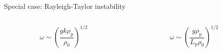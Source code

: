 \documentclass[final]{beamer} %
\begin{document}
\begin{frame}[t]
\begin{block}{Special case: Rayleigh-Taylor instability}
\begin{columns}[t]
\begin{column}{0.3\paperwidth}
        \vspace{1cm}

        \begin{columns}[c]
          
          \begin{column}{0.15\paperwidth}

            \centering $$\omega \sim \left(\frac{g k \rho_{\text{p}}}{\rho_{0}}\right)^{1/2}$$
        
          \end{column}

          \begin{column}{0.15\paperwidth}

            \centering $$\omega \sim \left(\frac{g \rho_{\text{p}}}{L_{\text{p}} \rho_{0}}\right)^{1/2}$$

          \end{column}
        \end{columns}
      \end{column}

    \end{columns}
        
  \end{block}
\end{frame}
\end{document}

